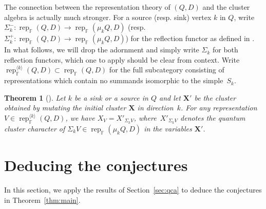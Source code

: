 \documentclass[pdftex]{sigma}
\newcommand{\bfX}{\mathbf{X}}
\newcommand{\FF}{\mathbb{F}}
\newcommand{\rep}{\operatorname{rep}}
\numberwithin{equation}{section}
\newtheorem{Theorem}{Theorem}
\begin{document}
 The connection between the representation theory of $(Q,D)$ and the cluster algebra is actually much stronger. For a source (resp. sink) vertex $k$ in $Q$, write $\Sigma_k^-\colon \rep_\FF(Q,D)\to\rep_\FF(\mu_kQ,D)$ (resp.\ $\Sigma_k^+\colon \rep_\FF(Q,D)\to\rep_\FF(\mu_kQ,D)$) for the reflection functor as defined in \cite[Section~2]{dlab-ringel}. In what follows, we will drop the adornment and simply write $\Sigma_k$ for both reflection functors, which one to apply should be clear from context. Write $\rep_\FF^{\langle k\rangle}(Q,D)\subset\rep_\FF(Q,D)$ for the full subcategory consisting of representations which contain no summands isomorphic to the simple~$S_k$.
 \begin{Theorem}[\cite{rupel1}] \label{th:reflection functor} Let $k$ be a sink or a source in $Q$ and let $\bfX'$ be the cluster obtained by mutating the initial cluster $\bfX$ in direction~$k$. For any representation $V\in\rep_\FF^{\langle k\rangle}(Q,D)$, we have $X_V=X'_{\Sigma_kV}$, where~$X'_{\Sigma_kV}$ denotes the quantum cluster character of $\Sigma_kV\in\rep_\FF(\mu_kQ,D)$ in the variables $\bfX'$.
 \end{Theorem}

\section{Deducing the conjectures}
In this section, we apply the results of Section~\ref{sec:qca} to deduce the conjectures in Theorem~\ref{thm:main}.
\end{document}
